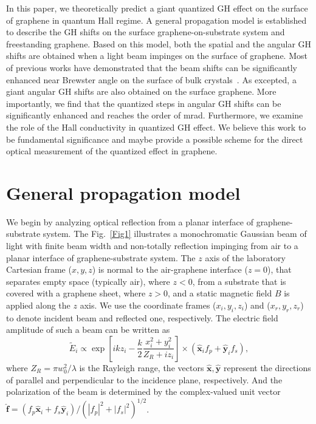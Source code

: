 \documentclass[twocolumn,showpacs,preprintnumbers,amsmath,amssymb]{revtex4}
\begin{document}
In this paper, we theoretically predict a giant quantized GH effect on the surface of graphene in quantum Hall regime.
A general propagation model
is established to describe the GH
shifts on the surface graphene-on-substrate system and freestanding graphene.
Based on this model, both the spatial and the angular GH
shifts are obtained when a light beam impinges on the surface of graphene.
Most of previous works have demonstrated that the beam shifts can be significantly enhanced near Brewster angle
on the surface of bulk crystals~\cite{Chan1985,Chang2009,Qin2009,Kong2012,Zhou2012I,Zhou2012II,Pan2013,Zhou2013III,Gotte2014,Grosche2015,Hermosa2016}.
As excepted, a giant angular GH shifts are also obtained on the surface graphene.
More importantly, we find that the quantized steps in angular GH shifts can be significantly enhanced and reaches the order of
mrad. Furthermore, we examine the role of the Hall conductivity in quantized GH effect.
We believe this work to be fundamental significance and maybe provide a possible scheme for the direct
optical measurement of the quantized effect in graphene.

\section{General propagation model}\label{SecII}
We begin by analyzing optical reflection from a
planar interface of graphene-substrate system.
The Fig.~\ref{Fig1} illustrates a monochromatic Gaussian
beam of light with finite beam width and
non-totally reflection impinging from air to a planar
interface of graphene-substrate system. The $z$ axis of
the laboratory Cartesian frame ($x,y,z$) is normal to
the air-graphene interface ($z=0$), that
separates empty space (typically air), where $z<0$,
from a substrate that is covered with a graphene sheet,
where $z>0$, and a static magnetic field $B$ is applied
along the $z$ axis. We use the coordinate frames ($x_i,y_i,z_i$)
and ($x_{r},y_{r},z_{r}$)
to denote incident beam and reflected one, respectively.
The electric field amplitude of such a beam can be
written as~\cite{Li2007,Aiello2008,Bliokh2013}
\begin{equation}
\tilde{E}_{i}\propto\exp\left[ikz_i-\frac{k}{2}\frac{x_{i}^2+y_{i}^2}{Z_R+iz_i}\right]\times(\hat{\textbf{x}}_{i}f_{p}+\hat{\textbf{y}}_{i}f_{s})\label{equ1},
\end{equation}
where $Z_R=\pi w_0^2/\lambda$ is the Rayleigh range, the vectors
$\mathbf{\hat{x}}, \mathbf{\hat{y}}$ represent the directions of parallel
and perpendicular to the incidence plane, respectively. And the
polarization of the beam is determined by the complex-valued
unit vector $\mathbf{\hat{f}} = (f_p \mathbf{\hat{x}}_i+f_s \mathbf{\hat{y}}_i)/(|f_p|^2+|f_s|^2)^{1/2}$.
\end{document}

